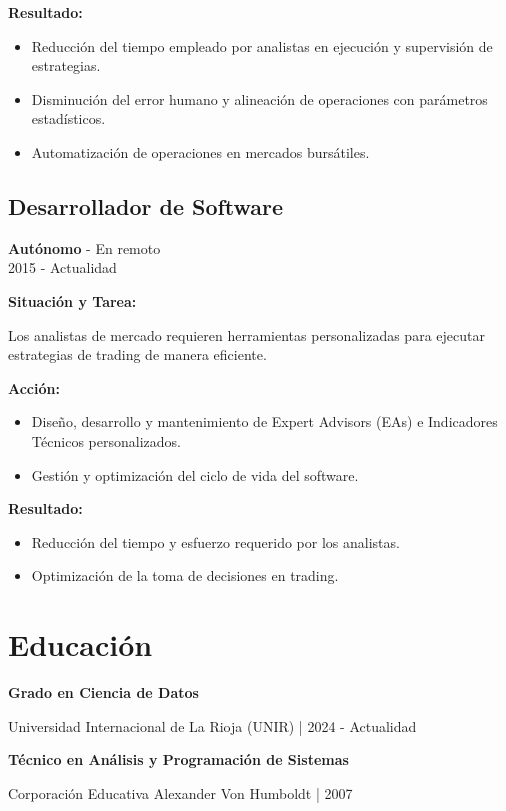 \documentclass[letterpaper,12pt]{article}
\begin{document}
\textbf{Resultado:}

\begin{itemize}
    \item Reducción del tiempo empleado por analistas en ejecución y supervisión de estrategias.
    \item Disminución del error humano y alineación de operaciones con parámetros estadísticos.
    \item Automatización de operaciones en mercados bursátiles.
\end{itemize}

\subsection*{Desarrollador de Software}
\textbf{Autónomo} - En remoto\\
2015 - Actualidad

\textbf{Situación y Tarea:}

Los analistas de mercado requieren herramientas personalizadas para ejecutar estrategias de trading de manera eficiente.

\textbf{Acción:}

\begin{itemize}
    \item Diseño, desarrollo y mantenimiento de Expert Advisors (EAs) e Indicadores Técnicos personalizados.
    \item Gestión y optimización del ciclo de vida del software.
\end{itemize}

\textbf{Resultado:}

\begin{itemize}
    \item Reducción del tiempo y esfuerzo requerido por los analistas.
    \item Optimización de la toma de decisiones en trading.
\end{itemize}

\section*{Educación}

\textbf{Grado en Ciencia de Datos}

Universidad Internacional de La Rioja (UNIR) | 2024 - Actualidad

\textbf{Técnico en Análisis y Programación de Sistemas}

Corporación Educativa Alexander Von Humboldt | 2007
\end{document}
